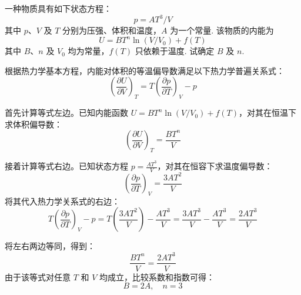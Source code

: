 \begin{exercise}\label{ex:11.2}
一种物质具有如下状态方程：
$$p = AT^3/V$$
其中 $p$、$V$ 及 $T$ 分别为压强、体积和温度，$A$ 为一个常量. 该物质的内能为
$$U = BT^n \ln(V/V_0) + f(T)$$
其中 $B$、$n$ 及 $V_0$ 均为常量，$f(T)$ 只依赖于温度. 试确定 $B$ 及 $n$.
\end{exercise}
\begin{solution}
根据热力学基本方程，内能对体积的等温偏导数满足以下热力学普遍关系式：
$$ \left( \frac{\partial U}{\partial V} \right)_T = T \left( \frac{\partial p}{\partial T} \right)_V - p $$

首先计算等式左边。已知内能函数 $U = BT^n \ln(V/V_0) + f(T)$，对其在恒温下求体积偏导数：
$$ \left( \frac{\partial U}{\partial V} \right)_T = \frac{B T^n}{V} $$

接着计算等式右边。已知状态方程 $p = \frac{AT^3}{V}$，对其在恒容下求温度偏导数：
$$ \left( \frac{\partial p}{\partial T} \right)_V = \frac{3AT^2}{V} $$
将其代入热力学关系式的右边：
$$ T \left( \frac{\partial p}{\partial T} \right)_V - p = T \left( \frac{3AT^2}{V} \right) - \frac{AT^3}{V} = \frac{3AT^3}{V} - \frac{AT^3}{V} = \frac{2AT^3}{V} $$

将左右两边等同，得到：
$$ \frac{B T^n}{V} = \frac{2AT^3}{V} $$
由于该等式对任意 $T$ 和 $V$ 均成立，比较系数和指数可得：
$$ B = 2A, \quad n = 3 $$
\end{solution}

